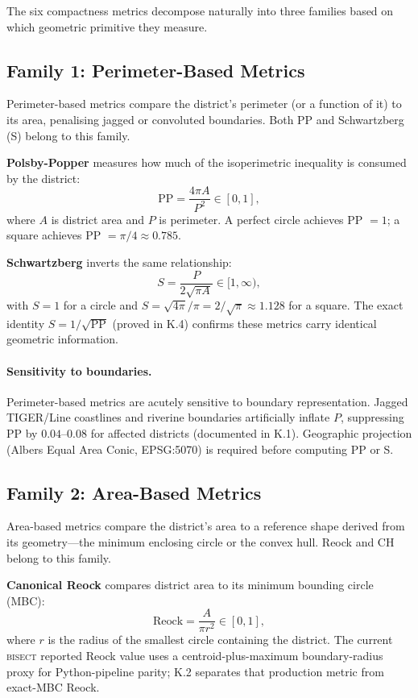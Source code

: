 The six compactness metrics decompose naturally into three families based on
which geometric primitive they measure.

\subsection{Family 1: Perimeter-Based Metrics}

Perimeter-based metrics compare the district's perimeter (or a function of it)
to its area, penalising jagged or convoluted boundaries.
Both PP and Schwartzberg (S) belong to this family.

\textbf{Polsby-Popper} measures how much of the isoperimetric inequality
is consumed by the district:
\[
  \text{PP} = \frac{4\pi A}{P^2} \in [0, 1],
\]
where $A$ is district area and $P$ is perimeter. A perfect circle achieves
PP $= 1$; a square achieves PP $= \pi/4 \approx 0.785$.

\textbf{Schwartzberg} inverts the same relationship:
\[
  S = \frac{P}{2\sqrt{\pi A}} \in [1, \infty),
\]
with $S = 1$ for a circle and $S = \sqrt{4\pi}/\pi = 2/\sqrt{\pi} \approx 1.128$
for a square.
The exact identity $S = 1/\sqrt{\text{PP}}$ (proved in K.4) confirms these
metrics carry identical geometric information.

\paragraph{Sensitivity to boundaries.}
Perimeter-based metrics are acutely sensitive to boundary representation.
Jagged TIGER/Line coastlines and riverine boundaries artificially inflate $P$,
suppressing PP by $0.04$--$0.08$ for affected districts (documented in K.1).
Geographic projection (Albers Equal Area Conic, EPSG:5070) is required before
computing PP or S.

\subsection{Family 2: Area-Based Metrics}

Area-based metrics compare the district's area to a reference shape derived
from its geometry---the minimum enclosing circle or the convex hull.
Reock and CH belong to this family.

\textbf{Canonical Reock} compares district area to its minimum bounding circle (MBC):
\[
  \text{Reock} = \frac{A}{\pi r^2} \in [0, 1],
\]
where $r$ is the radius of the smallest circle containing the district.
The current \textsc{bisect} reported Reock value uses a centroid-plus-maximum
boundary-radius proxy for Python-pipeline parity; K.2 separates that production
metric from exact-MBC Reock.

